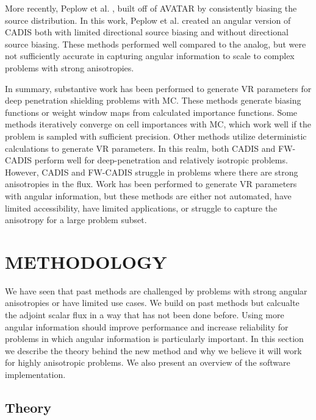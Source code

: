 \documentclass[12pt]{article}
\begin{document}
More recently, Peplow et al. \cite{peplow_consistent_2012}, built off of AVATAR by consistently biasing the source distribution. In this work, Peplow et al. created an angular version of CADIS both with limited directional source biasing and without directional source biasing. These methods performed well compared to the analog, but were not sufficiently accurate in capturing angular information to scale to complex problems with strong anisotropies. 

In summary, substantive work has been performed to generate VR parameters for deep penetration shielding problems with MC. These methods generate biasing functions or weight window maps from calculated importance functions. Some methods iteratively converge on cell importances with MC, which work well if the problem is sampled with sufficient precision. Other methods utilize deterministic calculations to generate VR parameters. In this realm, both CADIS and FW-CADIS perform well for deep-penetration and relatively isotropic problems. However, CADIS and FW-CADIS struggle in problems where there are strong anisotropies in the flux. Work has been performed to generate VR parameters with angular information, but these methods are either not automated, have limited accessibility, have limited applications, or struggle to capture the anisotropy for a large problem subset. 

\section{METHODOLOGY}
\label{sect::methodology}

We have seen that past methods are challenged by problems with strong angular anisotropies or have limited use cases.
We build on past methods but calcualte the adjoint scalar flux in a way that has not been done before.
Using more angular information should improve performance and increase reliability for problems in which angular information is particularly important. 
In this section we describe the theory behind the new method and why we believe it will work for highly anisotropic problems. We also present an overview of the software implementation.  

\subsection{Theory}
\label{subsect::theory}
\end{document}
